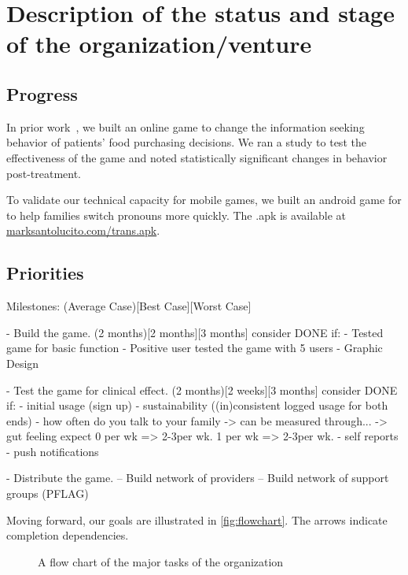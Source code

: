 \section{Description of the status and stage of the organization/venture}

\subsection{Progress}
In prior work~\cite{hwang2016}, we built an online game to change the information seeking behavior of patients' food purchasing decisions.
We ran a study to test the effectiveness of the game and noted statistically significant changes in behavior post-treatment.

To validate our technical capacity for mobile games, we built an android game for to help families switch pronouns more quickly. The .apk is available at \url{marksantolucito.com/trans.apk}. 


\subsection{Priorities}


Milestones: (Average Case)[Best Case][Worst Case]

- Build the game. (2 months)[2 months][3 months]
consider DONE if:
    - Tested game for basic function
    - Positive user tested the game with 5 users
    - Graphic Design

- Test the game for clinical effect. (2 months)[2 weeks][3 months]
consider DONE if:
    - initial usage (sign up)
    - sustainability ((in)consistent logged usage for both ends)
    - how often do you talk to your family
        -> can be measured through...
        -> gut feeling expect
         0 per wk => 2-3per wk.
         1 per wk => 2-3per wk.
    - self reports
    - push notifications
    
- Distribute the game.
-- Build network of providers
-- Build network of support groups (PFLAG)


Moving forward, our goals are illustrated in \autoref{fig:flowchart}.
The arrows indicate completion dependencies.
    
\begin{figure}[!h]
    \centering
    
    \caption{A flow chart of the major tasks of the organization}
    \label{fig:flowchart}
\end{figure}  


%
%

%

%
